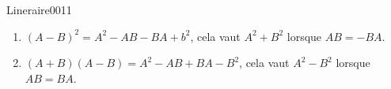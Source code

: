 \begin{corrige}{Lineraire0011}

	\begin{enumerate}

		\item
			$(A-B)^2=A^2-AB-BA+b^2$, cela vaut $A^2+B^2$ lorsque $AB=-BA$.
		\item
			$(A+B)(A-B)=A^2-AB+BA-B^2$, cela vaut $A^2-B^2$ lorsque $AB=BA$.

	\end{enumerate}
	

\end{corrige}
